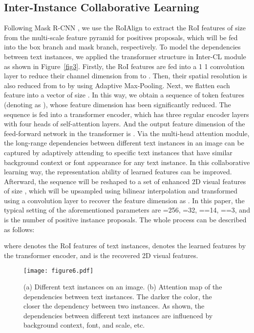 \subsection{Inter-Instance Collaborative Learning}
\label{subsec:interCL}
Following Mask R-CNN \citep{maskrcnn}, we use the RoIAlign to extract the RoI features of size      from the multi-scale feature pyramid for  positives proposals, which will be fed into the box branch and mask branch, respectively. To model the dependencies between text instances, we applied the transformer structure in Inter-CL module as shown in Figure~\ref{fig3}. Firstly, the  RoI features are fed into a 1  1 convolution layer to reduce their channel dimension from  to . Then, their spatial resolution is also reduced from    to    by using Adaptive Max-Pooling. Next, we flatten each feature into a vector of size . In this way, we obtain a sequence of  token features (denoting as ), whose feature dimension has been significantly reduced. The sequence  is fed into a transformer encoder, which has three regular encoder layers with four heads of self-attention layers. And the output feature dimension of the feed-forward network in the transformer is . Via the multi-head attention module, the long-range dependencies between different text instances in an image can be captured by adaptively attending to specific text instances that have similar background context or font appearance for any text instance. In this collaborative learning way, the representation ability of learned features can be improved. Afterward, the sequence  will be reshaped to a set of enhanced 2D visual features of size     , which will be upsampled using bilinear interpolation and transformed using a  convolution layer to recover the feature dimension as     . In this paper, the typical setting of the aforementioned parameters are =256, =32, ==14, ==3, and  is the number of positive instance proposals. The whole process can be described as follows:



where  denotes the RoI features of  text instances,  denotes the learned features by the transformer encoder, and  is the recovered 2D visual features. 

 \begin{figure}[ht]
  \centering
  \texttt{[image: figure6.pdf]}
  \caption{(a) Different text instances on an image. (b) Attention map of the dependencies between text instances. The darker the color, the closer the dependency between two instances. As shown, the dependencies between different text instances are influenced by background context, font, and scale, etc.}
  \label{fig6}
\end{figure}


